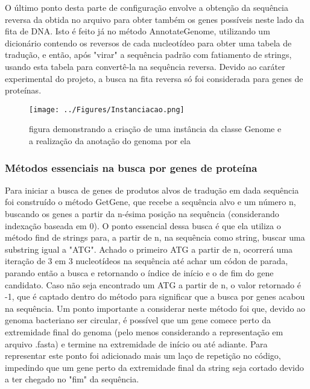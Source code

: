 \documentclass[brazilian,12pt,a4paper,final]{article}
\begin{document}
	\vspace{0.5cm}
	
	O último ponto desta parte de configuração envolve a obtenção da sequência reversa da obtida no arquivo para obter também os genes possíveis
	neste lado da fita de DNA. Isto é feito já no método AnnotateGenome, utilizando um dicionário contendo os reversos de cada nucleotídeo para obter uma
	tabela de tradução, e então, após "virar" a sequência padrão com fatiamento de strings, usando esta tabela para convertê-la na sequência reversa. Devido ao caráter experimental do projeto, a busca na fita
	reversa só foi considerada para genes de proteínas.
	
	
	\begin{figure}[hbtp]
		\begin{center}
			\texttt{[image: ../Figures/Instanciacao.png]}
			\caption{figura demonstrando a criação de uma instância da classe Genome e a realização da anotação do genoma por ela}
			\label{fig}
		\end{center}
	\end{figure}
	
	\subsubsection{Métodos essenciais na busca por genes de proteína}
	Para iniciar a busca de genes de produtos alvos de tradução em dada sequência foi construído o método GetGene, que recebe a sequência alvo e um número n, buscando os genes a partir da
	n-ésima posição na sequência (considerando indexação baseada em 0). O ponto essencial dessa busca é que ela utiliza o método find de strings para, a partir de n,
	na sequência como string, buscar uma substring igual a "ATG". Achado o primeiro ATG a partir de n, ocorrerá uma iteração de 3 em 3 nucleotídeos na sequência até achar um 
	códon de parada, parando então a busca e retornando o índice de início e o de fim do gene candidato. Caso não seja encontrado um ATG a partir de n, o valor retornado
	é -1, que é captado dentro do método para significar que a busca por genes  acabou na sequência. Um ponto importante a considerar neste método foi que, devido
	ao genoma bacteriano ser circular, é possível que um gene comece perto da extremidade final do genoma (pelo menos considerando a representação em arquivo .fasta) e termine
	na extremidade de início ou até adiante. Para representar este ponto foi adicionado mais um laço de repetição no código, impedindo que um gene perto da extremidade final da string seja cortado devido a ter chegado no "fim" da sequência.
	
\end{document}
